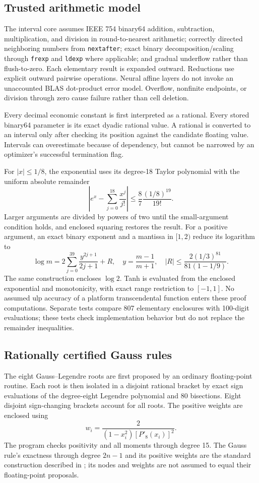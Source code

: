 \subsection{Trusted arithmetic model}
The interval core assumes IEEE 754 binary64 addition, subtraction, multiplication, and division in round-to-nearest arithmetic; correctly directed neighboring numbers from \texttt{nextafter}; exact binary decomposition/scaling through \texttt{frexp} and \texttt{ldexp} where applicable; and gradual underflow rather than flush-to-zero. Each elementary result is expanded outward. Reductions use explicit outward pairwise operations. Neural affine layers do not invoke an unaccounted BLAS dot-product error model. Overflow, nonfinite endpoints, or division through zero cause failure rather than cell deletion.

Every decimal economic constant is first interpreted as a rational. Every stored binary64 parameter is its exact dyadic rational value. A rational is converted to an interval only after checking its position against the candidate floating value. Intervals can overestimate because of dependency, but cannot be narrowed by an optimizer's successful termination flag.

For $|x|\leq1/8$, the exponential uses its degree-18 Taylor polynomial with the uniform absolute remainder
\[
 \left|e^x-\sum_{j=0}^{18}\frac{x^j}{j!}\right|
 \leq\frac{8}{7}\frac{(1/8)^{19}}{19!}.
\]
Larger arguments are divided by powers of two until the small-argument condition holds, and enclosed squaring restores the result. For a positive argument, an exact binary exponent and a mantissa in $[1,2)$ reduce its logarithm to
\[
 \log m=2\sum_{j=0}^{39}\frac{y^{2j+1}}{2j+1}+R,
 \quad y=\frac{m-1}{m+1},\quad
 |R|\leq\frac{2(1/3)^{81}}{81(1-1/9)}.
\]
The same construction encloses $\log2$. Tanh is evaluated from the enclosed exponential and monotonicity, with exact range restriction to $[-1,1]$. No assumed ulp accuracy of a platform transcendental function enters these proof computations. Separate tests compare 807 elementary enclosures with 100-digit evaluations; these tests check implementation behavior but do not replace the remainder inequalities.

\subsection{Rationally certified Gauss rules}
The eight Gauss--Legendre roots are first proposed by an ordinary floating-point routine. Each root is then isolated in a disjoint rational bracket by exact sign evaluations of the degree-eight Legendre polynomial and 80 bisections. Eight disjoint sign-changing brackets account for all roots. The positive weights are enclosed using
\[
 w_i=\frac{2}{(1-x_i^2)[P'_8(x_i)]^2}.
\]
The program checks positivity and all moments through degree 15. The Gauss rule's exactness through degree $2n-1$ and its positive weights are the standard construction described in \citet{NISTQuadrature}; its nodes and weights are not assumed to equal their floating-point proposals.

